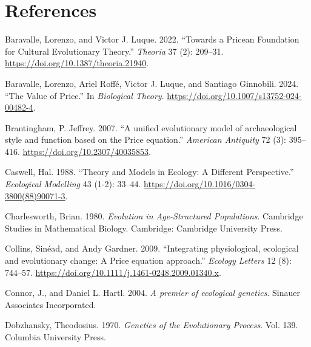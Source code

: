 \documentclass[
]{article}
\newlength{\cslhangindent}
\newlength{\cslentryspacingunit} %
\newenvironment{CSLReferences}[2] %
 {%
  \setlength{\parindent}{0pt}
  \ifodd #1
  \let\oldpar\par
  \def\par{\hangindent=\cslhangindent\oldpar}
  \fi
  \setlength{\parskip}{#2\cslentryspacingunit}
 }%
 {}
\begin{document}
\hypertarget{references}{%
\section*{References}\label{references}}

\hypertarget{refs}{}
\begin{CSLReferences}{1}{0}
\leavevmode{}%
Baravalle, Lorenzo, and Victor J. Luque. 2022. {``Towards a Pricean
Foundation for Cultural Evolutionary Theory.''} \emph{Theoria} 37 (2):
209--31. \url{https://doi.org/10.1387/theoria.21940}.

\leavevmode{}%
Baravalle, Lorenzo, Ariel Roffé, Victor J. Luque, and Santiago
Ginnobili. 2024. {``The Value of Price.''} In \emph{Biological Theory}.
\url{https://doi.org/10.1007/s13752-024-00482-4}.

\leavevmode{}%
Brantingham, P. Jeffrey. 2007. {``{A unified evolutionary model of
archaeological style and function based on the Price equation}.''}
\emph{American Antiquity} 72 (3): 395--416.
\url{https://doi.org/10.2307/40035853}.

\leavevmode{}%
Caswell, Hal. 1988. {``Theory and Models in Ecology: A Different
Perspective.''} \emph{Ecological Modelling} 43 (1-2): 33--44.
\url{https://doi.org/10.1016/0304-3800(88)90071-3}.

\leavevmode{}%
Charlesworth, Brian. 1980. \emph{Evolution in Age-Structured
Populations}. Cambridge Studies in Mathematical Biology. Cambridge:
Cambridge University Press.

\leavevmode{}%
Collins, Sinéad, and Andy Gardner. 2009. {``{Integrating physiological,
ecological and evolutionary change: A Price equation approach}.''}
\emph{Ecology Letters} 12 (8): 744--57.
\url{https://doi.org/10.1111/j.1461-0248.2009.01340.x}.

\leavevmode{}%
Connor, J., and Daniel L. Hartl. 2004. \emph{{A premier of ecological
genetics}}. Sinauer Associates Incorporated.

\leavevmode{}%
Dobzhansky, Theodosius. 1970. \emph{Genetics of the Evolutionary
Process}. Vol. 139. Columbia University Press.


\end{CSLReferences}
\end{document}
